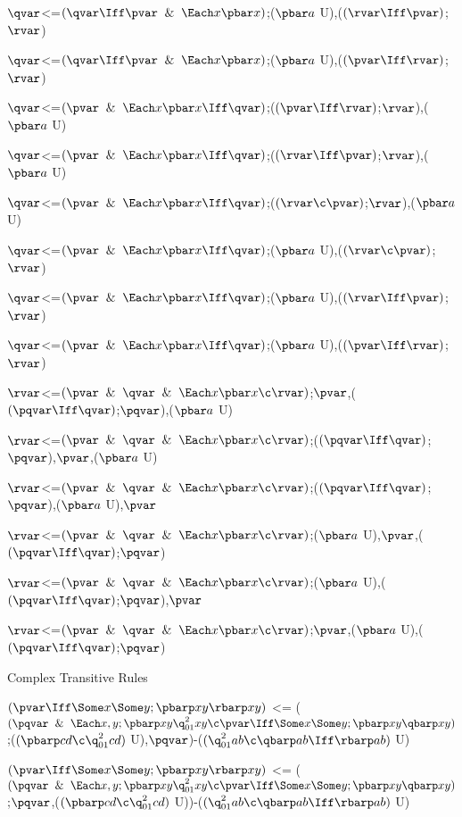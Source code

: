 $\qvar$<=$(\qvar \Iff \pvar \And \Each x \pbar x)$;($\pbar a$ U),($(\rvar \Iff \pvar)$;$\rvar$)

$\qvar$<=$(\qvar \Iff \pvar \And \Each x \pbar x)$;($\pbar a$ U),($(\pvar \Iff \rvar)$;$\rvar$)

$\qvar$<=$(\pvar \And \Each x \pbar x\Iff \qvar)$;($(\pvar \Iff \rvar)$;$\rvar$),($\pbar a$ U)

$\qvar$<=$(\pvar \And \Each x \pbar x\Iff \qvar)$;($(\rvar \Iff \pvar)$;$\rvar$),($\pbar a$ U)

$\qvar$<=$(\pvar \And \Each x \pbar x\Iff \qvar)$;($(\rvar \c \pvar)$;$\rvar$),($\pbar a$ U)

$\qvar$<=$(\pvar \And \Each x \pbar x\Iff \qvar)$;($\pbar a$ U),($(\rvar \c \pvar)$;$\rvar$)

$\qvar$<=$(\pvar \And \Each x \pbar x\Iff \qvar)$;($\pbar a$ U),($(\rvar \Iff \pvar)$;$\rvar$)

$\qvar$<=$(\pvar \And \Each x \pbar x\Iff \qvar)$;($\pbar a$ U),($(\pvar \Iff \rvar)$;$\rvar$)

$\rvar$<=$(\pvar \And \qvar \And \Each x \pbar x \c \rvar)$;$\pvar$,($(\pqvar \Iff \qvar)$;$\pqvar$),($\pbar a$ U)

$\rvar$<=$(\pvar \And \qvar \And \Each x \pbar x \c \rvar)$;($(\pqvar \Iff \qvar)$;$\pqvar$),$\pvar$,($\pbar a$ U)

$\rvar$<=$(\pvar \And \qvar \And \Each x \pbar x \c \rvar)$;($(\pqvar \Iff \qvar)$;$\pqvar$),($\pbar a$ U),$\pvar$

$\rvar$<=$(\pvar \And \qvar \And \Each x \pbar x \c \rvar)$;($\pbar a$ U),$\pvar$,($(\pqvar \Iff \qvar)$;$\pqvar$)

$\rvar$<=$(\pvar \And \qvar \And \Each x \pbar x \c \rvar)$;($\pbar a$ U),($(\pqvar \Iff \qvar)$;$\pqvar$),$\pvar$

$\rvar$<=$(\pvar \And \qvar \And \Each x \pbar x \c \rvar)$;$\pvar$,($\pbar a$ U),($(\pqvar \Iff \qvar)$;$\pqvar$)

\lineb
Complex Transitive Rules

$(\pvar \Iff \Some x \Some y ;\pbarp xy \rbarp xy)$ <= ($(\pqvar \And \Each x,y ;\pbarp xy \q^{2}_{01}xy \c \pvar \Iff \Some x \Some y ; \pbarp xy \qbarp xy)$;($(\pbarp cd \c \q^{2}_{01}cd)$ U),$\pqvar$)-($(\q^{2}_{01}ab \c \qbarp ab \Iff \rbarp ab)$ U)

$(\pvar \Iff \Some x \Some y ;\pbarp xy \rbarp xy)$ <= ($(\pqvar \And \Each x,y ;\pbarp xy \q^{2}_{01}xy \c \pvar \Iff \Some x \Some y ; \pbarp xy \qbarp xy)$;$\pqvar$,($(\pbarp cd \c \q^{2}_{01}cd)$ U))-($(\q^{2}_{01}ab \c \qbarp ab \Iff \rbarp ab)$ U)


